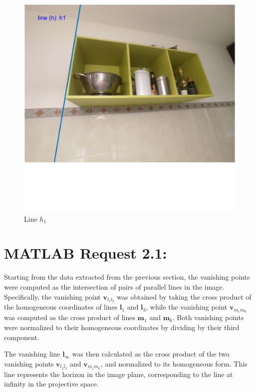 \documentclass{Configuration_Files/PoliMi3i_thesis}
\begin{document}
\begin{figure}[H]
    \centering
    \includegraphics[width=0.5\linewidth]{Project Template/Images/h1.png}
    \caption{Line $h_1$}
    \label{fig:enter-label}
\end{figure}

\newpage
\section{MATLAB Request 2.1: }
Starting from the data extracted from the previous section, the vanishing points were computed as the intersection of pairs of parallel lines in the image. Specifically, the vanishing point $\mathbf{v}_{l_1l_3}$ was obtained by taking the cross product of the homogeneous coordinates of lines $\mathbf{l}_1$ and $\mathbf{l}_3$, while the vanishing point $\mathbf{v}_{m_1m_6}$ was computed as the cross product of lines $\mathbf{m}_1$ and $\mathbf{m}_6$. Both vanishing points were normalized to their homogeneous coordinates by dividing by their third component. 

The vanishing line $\mathbf{l}_{\infty}$ was then calculated as the cross product of the two vanishing points $\mathbf{v}_{l_1l_3}$ and $\mathbf{v}_{m_1m_6}$, and normalized to its homogeneous form. This line represents the horizon in the image plane, corresponding to the line at infinity in the projective space.
\end{document}
